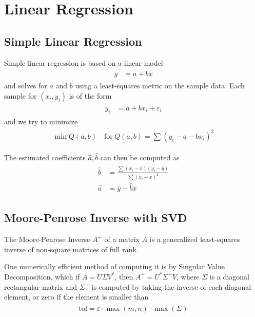 \documentclass[12pt,a4paper,oneside,openany]{article}
\begin{document}
\section{Linear Regression}

\subsection{Simple Linear Regression}

Simple linear regression is based on a linear model 
\begin{gather}
\begin{aligned}
y &= a + b x
\end{aligned}
\end{gather}
and solves for $a$ and $b$ using a least-squares metric on the sample data. Each sample for $(x_i,y_i)$ is of the form
\begin{gather}
\begin{aligned}
y_i &= a + b x_i + \varepsilon_i
\end{aligned}
\end{gather}
and we try to minimize
\begin{gather}
\begin{aligned}
\min Q(a,b) \quad \mathrm{for} \ Q(a,b) = \sum (y_i - a - b x_i)^2
\end{aligned}
\end{gather}

The estimated coefficients $\hat{a}, \hat{b}$ can then be computed as
\begin{gather}
\begin{aligned}
\hat{b} &= \frac{\sum{(x_i-\bar{x})(y_i-\bar{y})}}{\sum{(x_i - \bar{x})^2}} \\
\hat{a} &= \bar{y} - \hat{b} \bar{x}
\end{aligned}
\end{gather}

\subsection{Moore-Penrose Inverse with SVD}

The Moore-Penrose Inverse $A^+$ of a matrix $A$ is a generalized least-squares inverse of non-square matrices of full rank. 

One numerically efficient method of computing it is by Singular Value Decomposition, which if $A=U\Sigma V^*$, then $A^+=U^*\Sigma^+V$, where $\Sigma$ is a diagonal rectangular matrix and $\Sigma^+$ is computed by taking the inverse of each diagonal element, or zero if the element is smaller than
\begin{gather}
\begin{aligned}
\mathrm{tol} = \varepsilon \cdot \max(m,n) \cdot \max(\Sigma)
\end{aligned}
\end{gather}
\end{document}
